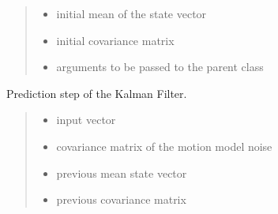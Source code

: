 \documentclass[letterpaper,10pt,english]{sphinxmanual}
\begin{document}
\begin{fulllineitems}
\begin{fulllineitems}
\begin{quote}
\begin{description}
\begin{itemize}
\item {} 
\sphinxAtStartPar
{} \textendash{} initial mean of the state vector

\item {} 
\sphinxAtStartPar
{} \textendash{} initial covariance matrix

\item {} 
\sphinxAtStartPar
{} \textendash{} arguments to be passed to the parent class

\end{itemize}

\end{description}\end{quote}

\end{fulllineitems}


\begin{fulllineitems}
\label{\detokenize{KF:KF.KF.Prediction}}
\pysigstartsignatures
{}
\pysigstopsignatures
\sphinxAtStartPar
Prediction step of the Kalman Filter.
\begin{quote}\begin{description}
\begin{itemize}
\item {} 
\sphinxAtStartPar
{} \textendash{} input vector

\item {} 
\sphinxAtStartPar
{} \textendash{} covariance matrix of the motion model noise

\item {} 
\sphinxAtStartPar
{} \textendash{} previous mean state vector

\item {} 
\sphinxAtStartPar
{} \textendash{} previous covariance matrix


\end{itemize}
\end{description}
\end{quote}
\end{fulllineitems}
\end{fulllineitems}
\end{document}
